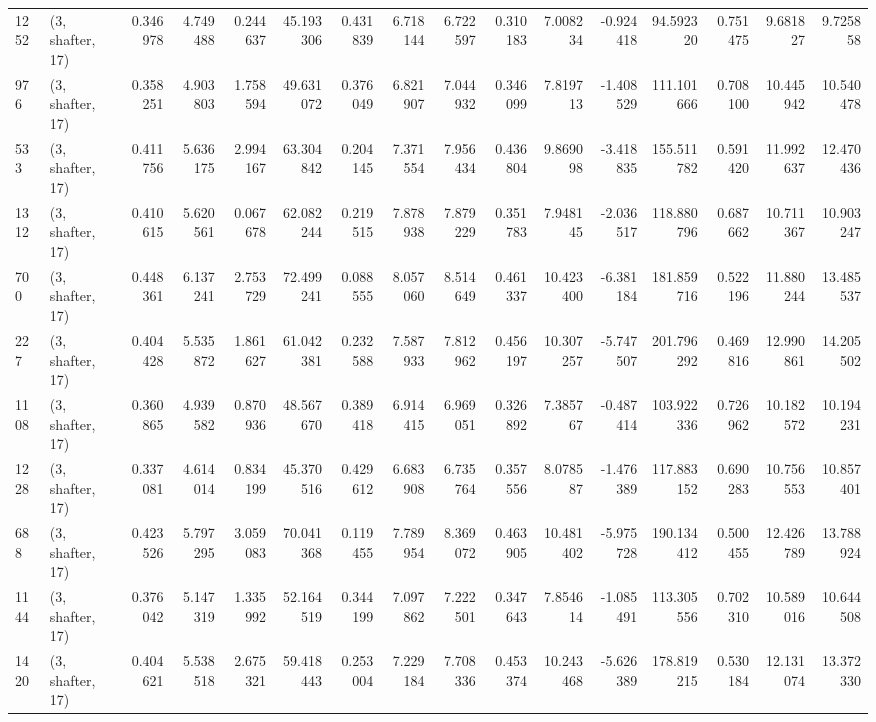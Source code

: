 \begin{tabular}{llrrrrrrrrrrrrrr}
1252 &  (3, shafter, 17) &   0.346978 &   4.749488 &   0.244637 &     45.193306 &    0.431839 &    6.718144 &    6.722597 &  0.310183 &   7.008234 &  -0.924418 &    94.592320 &   0.751475 &   9.681827 &   9.725858 \\
976  &  (3, shafter, 17) &   0.358251 &   4.903803 &   1.758594 &     49.631072 &    0.376049 &    6.821907 &    7.044932 &  0.346099 &   7.819713 &  -1.408529 &   111.101666 &   0.708100 &  10.445942 &  10.540478 \\
533  &  (3, shafter, 17) &   0.411756 &   5.636175 &   2.994167 &     63.304842 &    0.204145 &    7.371554 &    7.956434 &  0.436804 &   9.869098 &  -3.418835 &   155.511782 &   0.591420 &  11.992637 &  12.470436 \\
1312 &  (3, shafter, 17) &   0.410615 &   5.620561 &   0.067678 &     62.082244 &    0.219515 &    7.878938 &    7.879229 &  0.351783 &   7.948145 &  -2.036517 &   118.880796 &   0.687662 &  10.711367 &  10.903247 \\
700  &  (3, shafter, 17) &   0.448361 &   6.137241 &   2.753729 &     72.499241 &    0.088555 &    8.057060 &    8.514649 &  0.461337 &  10.423400 &  -6.381184 &   181.859716 &   0.522196 &  11.880244 &  13.485537 \\
227  &  (3, shafter, 17) &   0.404428 &   5.535872 &   1.861627 &     61.042381 &    0.232588 &    7.587933 &    7.812962 &  0.456197 &  10.307257 &  -5.747507 &   201.796292 &   0.469816 &  12.990861 &  14.205502 \\
1108 &  (3, shafter, 17) &   0.360865 &   4.939582 &   0.870936 &     48.567670 &    0.389418 &    6.914415 &    6.969051 &  0.326892 &   7.385767 &  -0.487414 &   103.922336 &   0.726962 &  10.182572 &  10.194231 \\
1228 &  (3, shafter, 17) &   0.337081 &   4.614014 &   0.834199 &     45.370516 &    0.429612 &    6.683908 &    6.735764 &  0.357556 &   8.078587 &  -1.476389 &   117.883152 &   0.690283 &  10.756553 &  10.857401 \\
688  &  (3, shafter, 17) &   0.423526 &   5.797295 &   3.059083 &     70.041368 &    0.119455 &    7.789954 &    8.369072 &  0.463905 &  10.481402 &  -5.975728 &   190.134412 &   0.500455 &  12.426789 &  13.788924 \\
1144 &  (3, shafter, 17) &   0.376042 &   5.147319 &   1.335992 &     52.164519 &    0.344199 &    7.097862 &    7.222501 &  0.347643 &   7.854614 &  -1.085491 &   113.305556 &   0.702310 &  10.589016 &  10.644508 \\
1420 &  (3, shafter, 17) &   0.404621 &   5.538518 &   2.675321 &     59.418443 &    0.253004 &    7.229184 &    7.708336 &  0.453374 &  10.243468 &  -5.626389 &   178.819215 &   0.530184 &  12.131074 &  13.372330 \\

\end{tabular}
